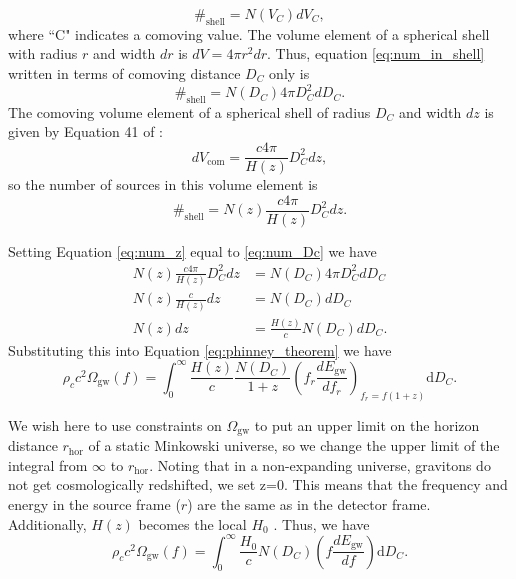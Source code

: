 \documentclass[]{article}
\newcommand{\Ogw}{\Omega_{\mathrm{gw}}}
\begin{document}
\begin{equation}
\#_{\text{shell}} = N(V_{C})dV_{C} ,
\label{eq:num_in_shell}
\end{equation} 
where ``C" indicates a comoving value. 
The volume element of a spherical shell with radius $r$ and width $dr$ is $dV = 4 \pi r^2 dr$.
Thus, equation \ref{eq:num_in_shell} written in terms of comoving distance $D_C$ only is 
\begin{equation}
\#_{\text{shell}} = N(D_C) 4\pi D_C^2 dD_C  .\label{eq:num_Dc}
\end{equation}
The comoving volume element of a spherical shell of radius $D_C$ and width $dz$ is given by Equation 41 of \cite{cosmo_4_astro}:
\begin{equation*}
dV_{\text{com}} = \frac{c 4\pi}{H(z)} D_C^2 dz, 
\end{equation*}
so the number of sources in this volume element is 
\begin{equation}
\#_{\text{shell}} = N(z)\frac{c 4\pi}{H(z)} D_C^2 dz .
\label{eq:num_z}
\end{equation}


Setting Equation \ref{eq:num_z} equal to \ref{eq:num_Dc} we have
\begin{align}
	N(z) \frac{c 4\pi}{H(z)} D_C^2 dz &= N(D_C) 4\pi D_C^2 dD_C \nonumber \\
	N(z) \frac{c}{H(z)} dz &= N(D_C) dD_C \nonumber \\
	N(z) dz &=  \frac{H(z)}{c} N(D_C) dD_C .
	\label{eq:num_z_eq_num_Dc} 
\end{align}
Substituting this into Equation \ref{eq:phinney_theorem} we have
\begin{equation*}
\rho_c c^2 \Ogw(f) =  \int_{0}^{\infty} \frac{H(z)}{c} \frac{N(D_C)}{1+z} (f_r \frac{dE_{\mathrm{gw}}}{df_r})_{f_r = f(1+z)} \mathrm{d}D_C .
\end{equation*}

We wish here to use constraints on $\Ogw$ to put an upper limit on the horizon distance $r_{\text{hor}}$ of a static Minkowski universe, so we change the upper limit of the integral from $\infty$ to $r_{\text{hor}}$. 
Noting that in a non-expanding universe, gravitons do not get cosmologically redshifted, we set z=0. 
This means that the frequency and energy in the source frame ($r$) are the same as in the detector frame.
Additionally, $H(z)$ becomes the local $H_0$ .
Thus, we have 
\begin{equation}
	\rho_c c^2 \Ogw(f) =  \int_{0}^{\infty} \frac{H_0}{c} N(D_C) (f \frac{dE_{\mathrm{gw}}}{df}) \mathrm{d}D_C .
	\label{eq:euclid_omega}
\end{equation}
\end{document}
